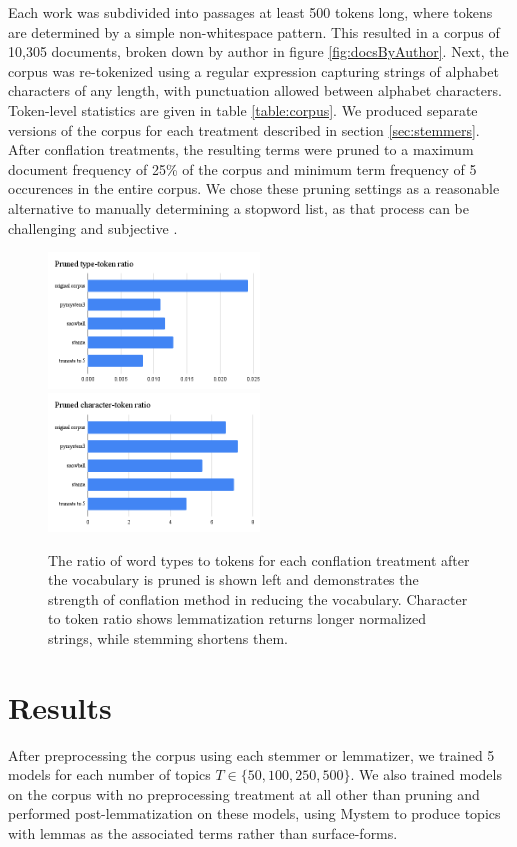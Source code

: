 \documentclass[11pt,a4paper]{article}
\begin{document}
Each work was subdivided into passages at least 500 tokens long, where tokens are determined by a simple non-whitespace pattern. This resulted in a corpus of 10,305 documents, broken down by author in figure \ref{fig:docsByAuthor}. Next, the corpus was re-tokenized using a regular expression capturing strings of alphabet characters of any length, with punctuation allowed between alphabet characters. Token-level statistics are given in table \ref{table:corpus}. We produced separate versions of the corpus for each treatment described in section \ref{sec:stemmers}. After conflation treatments, the resulting terms were pruned to a maximum document frequency of 25\% of the corpus and minimum term frequency of 5 occurences in the entire corpus. We chose these pruning settings as a reasonable alternative to manually determining a stopword list, as that process can be challenging and subjective \cite{schofield-etal-2017-pulling}.


\begin{figure}[th]
    \includegraphics[width=0.5\textwidth]{pruned_type_token_ratio.png}
    \includegraphics[width=0.5\textwidth]{pruned_character_token_ratio.png}
    \caption{The ratio of word types to tokens for each conflation treatment after the vocabulary is pruned is shown left and demonstrates the strength of conflation method in reducing the vocabulary. Character to token ratio shows lemmatization returns longer normalized strings, while stemming shortens them.}
    \label{fig:conflation_merics}
\end{figure}


\section{Results}
After preprocessing the corpus using each stemmer or lemmatizer, we trained 5 models for each number of topics $T\in \{50, 100, 250, 500\}$. We also trained models on the corpus with no preprocessing treatment at all other than pruning and performed post-lemmatization on these models, using Mystem to produce topics with lemmas as the associated terms rather than surface-forms.
\end{document}
